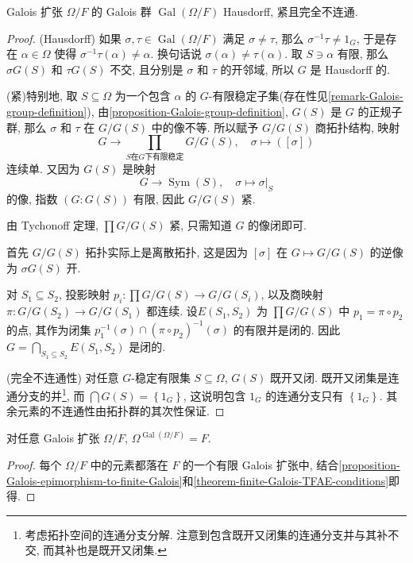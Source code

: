 \begin{proposition}
  Galois 扩张 \( \Omega/F \) 的 Galois 群 \( \operatorname{Gal}(\Omega/F) \)
  Hausdorff, 紧且完全不连通.
\end{proposition}
\begin{proof}
  (Hausdorff)
  如果 \( \sigma, \tau \in \operatorname{Gal}(\Omega/F) \) 满足 \( \sigma \neq
  \tau \), 那么 \( \sigma^{-1}\tau \neq 1_G \), 于是存在 \( \alpha \in \Omega
  \) 使得 \( \sigma^{-1}\tau(\alpha) \neq \alpha \).
  换句话说 \( \sigma(\alpha) \neq \tau(\alpha) \).
  取 \( S \ni \alpha \) 有限, 那么 \( \sigma G(S) \) 和 \( \tau G(S) \) 不交,
  且分别是 \( \sigma \) 和 \( \tau \) 的开邻域, 所以 \( G \) 是 Hausdorff 的.

  (紧)特别地, 取 \( S \subseteq \Omega \) 为一个包含 \( \alpha \) 的 \( G
  \)-有限稳定子集(存在性见\cref{remark-Galois-group-definition}),
  由\cref{proposition-Galois-group-definition}, \( G(S) \) 是 \( G \)
  的正规子群, 那么 \( \sigma \) 和 \( \tau \) 在 \( G / G(S) \) 中的像不等.
  所以赋予 \( G/G(S) \) 商拓扑结构, 映射
  \[
    G \to \prod_{S \text{在} G \text{下有限稳定}} G/G(S),\quad \sigma \mapsto ([\sigma])
  \]
  连续单.
  又因为 \( G(S) \) 是映射
  \[
    G \to \operatorname{Sym}(S),\quad \sigma \mapsto \left. \sigma
      \right\vert_{S}
  \]
  的像, 指数 \( (G: G(S)) \) 有限, 因此 \( G/G(S) \) 紧.

  由 Tychonoff 定理, \( \prod G/G(S) \) 紧, 只需知道 \( G \) 的像闭即可.
  
  首先 \( G/G(S) \) 拓扑实际上是离散拓扑, 这是因为 \( [\sigma] \) 在 \( G
  \mapsto G/G(S) \) 的逆像为 \( \sigma G(S) \) 开.

  对 \( S_1 \subseteq S_2 \), 投影映射 \( p_i: \prod G/G(S) \to G/G(S_i) \),
  以及商映射 \( \pi: G/G(S_2) \to G/G(S_1) \) 都连续.
  设\( E(S_1, S_2) \) 为 \( \prod G/G(S) \) 中 \( p_1 = \pi \circ p_2 \)
  的点, 其作为闭集 \( p_1^{-1}(\sigma) \cap
  (\pi \circ p_2)^{-1}(\sigma) \) 的有限并是闭的.
  因此 \( G = \bigcap_{S_1 \subseteq S_2} E(S_1, S_2) \) 是闭的.

  (完全不连通性) 对任意 \( G \)-稳定有限集 \( S \subseteq \Omega \), \( G(S) \)
  既开又闭.
  既开又闭集是连通分支的并\footnote{考虑拓扑空间的连通分支分解.
  注意到包含既开又闭集的连通分支并与其补不交, 而其补也是既开又闭集.}, 而 \(
  \bigcap G(S) = \left\lbrace 1_G \right\rbrace \), 这说明包含 \( 1_G \)
  的连通分支只有 \( \left\lbrace 1_G \right\rbrace \).
  其余元素的不连通性由拓扑群的其次性保证.
\end{proof}

\begin{proposition}
  对任意 Galois 扩张 \( \Omega/F \), \( \Omega^{\operatorname{Gal}(\Omega/F)} =
  F \).
\end{proposition}
\begin{proof}
  每个 \( \Omega / F \) 中的元素都落在 \( F \) 的一个有限 Galois 扩张中,
  结合\cref{proposition-Galois-epimorphism-to-finite-Galois}和\cref{theorem-finite-Galois-TFAE-conditions}即得.
\end{proof}

